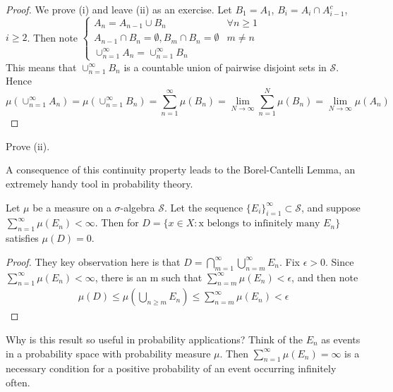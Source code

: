 \documentclass[11pt]{scrartcl}
\begin{document}
\begin{proof}
We prove (i) and leave (ii) as an exercise. Let $B_1 = A_1$, $B_i = A_i \cap A_{i-1}^c$, $i\geq 2$. Then note $\begin{cases}
A_n = A_{n-1} \cup B_n & \forall n\geq 1 \\
A_{n-1} \cap B_n = \emptyset, B_m \cap B_n = \emptyset &  m\neq n \\
\cup_{n=1}^\infty A_n = \cup_{n=1}^\infty B_n
\end{cases}$\\
This means that $ \cup_{n=1}^\infty B_n$ is a countable union of pairwise disjoint sets in $\mathcal{S}$. 
Hence 
$$\mu(\cup_{n=1}^\infty A_n) = \mu(\cup_{n=1}^\infty B_n) = \sum_{n=1}^\infty \mu(B_n) = \lim_{N \rightarrow \infty} \sum_{n=1}^N \mu(B_n) = \lim_{N\rightarrow \infty} \mu(A_n)
$$
\end{proof}

\begin{exercise}
Prove (ii).
\end{exercise}

A consequence of this continuity property leads to the Borel-Cantelli Lemma, an extremely handy tool in probability theory.

\begin{lemma}
Let $\mu$ be a measure on a $\sigma$-algebra $\mathcal{S}$. Let the sequence $\{E_i\}_{i=1}^\infty \subset \mathcal{S}$, and suppose $\sum_{n=1}^\infty \mu(E_n) <\infty$.
Then for $D = \{x\in X : \text{x belongs to infinitely many } E_n\}$ satisfies $\mu(D) = 0$. 
\end{lemma}

\begin{proof}
They key observation here is that $D = \bigcap_{m=1}^\infty \bigcup_{n=m}^\infty E_n$. Fix $\epsilon > 0$. Since $\sum_{n=1}^\infty \mu(E_n) <\infty$, there is an m such that $\sum_{n=m}^\infty \mu(E_n) <\epsilon$, and then note 
\begin{align*}
\mu(D) \leq \mu(\bigcup_{n\geq m} E_n) \leq \sum_{n=m}^\infty \mu(E_n) <\epsilon 
\end{align*}
\end{proof}

\begin{example}
Why is this result so useful in probability applications? Think of the $E_n$ as events in a probability space with probability measure $\mu$. Then  $\sum_{n=1}^\infty \mu(E_n) = \infty$ is a necessary condition for a positive probability of an event occurring infinitely often.
\end{example}
\end{document}
